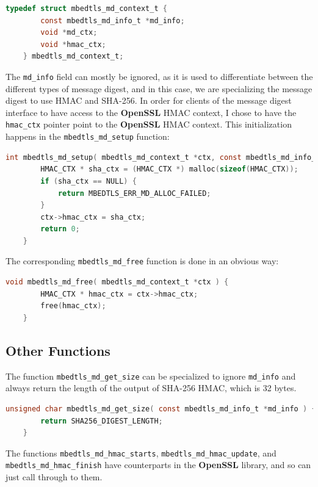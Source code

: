 \documentclass[pageno]{jpaper}
\newcommand{\stdtitle}[1]{\textbf{#1}}
\begin{document}
\begin{lstlisting}[language=C]
    typedef struct mbedtls_md_context_t {
        const mbedtls_md_info_t *md_info;
        void *md_ctx;
        void *hmac_ctx;
    } mbedtls_md_context_t;
\end{lstlisting}

The \lstinline{md_info} field can mostly be ignored, as it is used to differentiate between the different types of message digest, and in this case, we are specializing the message digest to use HMAC and SHA-256. In order for clients of the message digest interface to have access to the \stdtitle{OpenSSL} HMAC context, I chose to have the \lstinline{hmac_ctx} pointer point to the \stdtitle{OpenSSL} HMAC context. This initialization happens in the \lstinline{mbedtls_md_setup} function:

\begin{lstlisting}[language=C]
    int mbedtls_md_setup( mbedtls_md_context_t *ctx, const mbedtls_md_info_t *md_info, int hmac ) {
        HMAC_CTX * sha_ctx = (HMAC_CTX *) malloc(sizeof(HMAC_CTX));
        if (sha_ctx == NULL) {
            return MBEDTLS_ERR_MD_ALLOC_FAILED;
        }
        ctx->hmac_ctx = sha_ctx;
        return 0;
    }
\end{lstlisting}

The corresponding \lstinline{mbedtls_md_free} function is done in an obvious way:

\begin{lstlisting}[language=C]
    void mbedtls_md_free( mbedtls_md_context_t *ctx ) {
        HMAC_CTX * hmac_ctx = ctx->hmac_ctx;
        free(hmac_ctx);
    }
\end{lstlisting}


\subsection{Other Functions}

The function \lstinline{mbedtls_md_get_size} can be specialized to ignore \lstinline{md_info} and always return the length of the output of SHA-256 HMAC, which is 32 bytes.

\begin{lstlisting}[language=C]
    unsigned char mbedtls_md_get_size( const mbedtls_md_info_t *md_info ) {
        return SHA256_DIGEST_LENGTH;
    }
\end{lstlisting}

The functions \lstinline{mbedtls_md_hmac_starts}, \lstinline{mbedtls_md_hmac_update}, and\\ \lstinline{mbedtls_md_hmac_finish} have counterparts in the \stdtitle{OpenSSL} library, and so can just call through to them.
\end{document}
